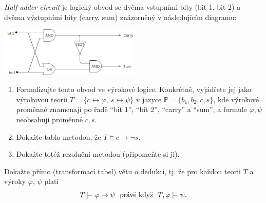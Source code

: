 \documentclass[a4paper,12pt]{article}
\begin{document}
\medskip\begin{problem}
    \emph{Half-adder circuit} je logický obvod se dvěma vstupními bity (bit 1, bit 2) a dvěma výstupními bity (carry, sum) znázorněný v následujícím diagramu:
    \begin{center}
        \includegraphics[width=0.5\textwidth]{files/half-adder.png}
    \end{center}
    \begin{enumerate}
            \item Formalizujte tento obvod ve výrokové logice. Konkrétně, vyjádřete jej jako výrokovou teorii $T=\{c\leftrightarrow \varphi,\ s\leftrightarrow \psi\}$ v jazyce $\mathbb P=\{b_1,b_2,c,s\}$, kde výrokové proměnné znamenají po řadě ``bit 1'', ``bit 2'', ``carry'' a ``sum'', a formule $\varphi,\psi$ neobsahují proměnné $c,s$.
            \item Dokažte tablo metodou, že $T\models c\to\neg s$.
            \item Dokažte totéž rezoluční metodou (připomeňte si ji).
    \end{enumerate}
\end{problem}



\medskip\begin{problem}
        Dokažte přímo (transformací tabel) větu o dedukci, tj. že pro každou teorii $T$ a výroky $\varphi$, $\psi$ platí
        $$T \proves \varphi\to\psi\text{\ \ právě když\ \ }T,\varphi\proves  \psi.$$
\end{problem}
\end{document}
